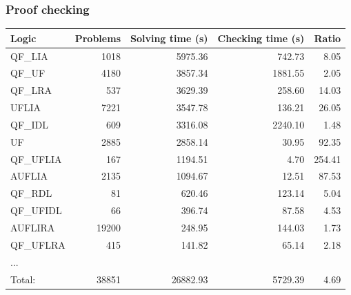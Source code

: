 \documentclass[usepdftitle=false,aspectratio=169]{beamer}
\begin{document}
\begin{frame}
  \frametitle{Proof checking}
  \centering
  \footnotesize
  \begin{tabular}{lr@{\hskip 3ex}r@{\hskip 3ex}r@{\hskip 3ex}r}
      \toprule
      \textbf{Logic} & \textbf{Problems} & \textbf{Solving time (s)} &
          \textbf{Checking time (s)} & \textbf{Ratio} \\ \midrule
      QF\_LIA & 1018 & 5975.36 & 742.73 & 8.05 \\
      QF\_UF & 4180 & 3857.34 & 1881.55 & 2.05 \\
      QF\_LRA & 537 & 3629.39 & 258.60 & 14.03 \\
      UFLIA & 7221 & 3547.78 & 136.21 & 26.05 \\
      QF\_IDL & 609 & 3316.08 & 2240.10 & 1.48 \\
      UF & 2885 & 2858.14 & 30.95 & 92.35 \\
      QF\_UFLIA & 167 & 1194.51 & 4.70 & 254.41 \\
      AUFLIA & 2135 & 1094.67 & 12.51 & 87.53 \\
      QF\_RDL & 81 & 620.46 & 123.14 & 5.04 \\
      QF\_UFIDL & 66 & 396.74 & 87.58 & 4.53 \\
      AUFLIRA & 19200 & 248.95 & 144.03 & 1.73 \\
      QF\_UFLRA & 415 & 141.82 & 65.14 & 2.18 \\
      ... \\
      \midrule
      Total: & 38851 & 26882.93 & 5729.39 & 4.69 \\
    \bottomrule
  \end{tabular}
\end{frame}
\end{document}
